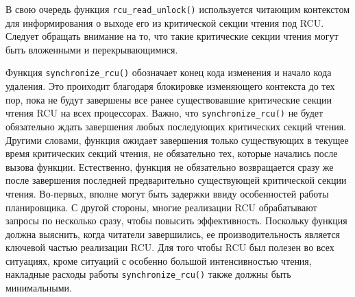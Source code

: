 В свою очередь функция \texttt{rcu\_read\_unlock()} используется читающим
контекстом для информирования о выходе его из критической секции чтения под RCU.
Следует обращать внимание на то, что такие критические секции чтения могут быть
вложенными и перекрывающимися.

Функция \texttt{synchronize\_rcu()} обозначает конец кода изменения и начало
кода удаления. Это проиходит благодаря блокировке изменяющего контекста до тех
пор, пока не будут завершены все ранее существовавшие критические секции чтения
RCU на всех процессорах. Важно, что \texttt{synchronize\_rcu()} не будет
обязательно ждать завершения любых последующих критических секций чтения.
Другими словами, функция ожидает завершения только существующих в текущее время
критических секций чтения, не обязательно тех, которые начались после вызова
функции. Естественно, функция не обязательно возвращается сразу же после
завершения последней предварительно существующей критической секции чтения.
Во-первых, вполне могут быть задержки ввиду особенностей работы планировщика. С
другой стороны, многие реализации RCU обрабатывают запросы по несколько сразу,
чтобы повысить эффективность. Поскольку функция должна выяснить, когда читатели
завершились, ее производительность является ключевой частью реализации RCU. Для
того чтобы RCU был полезен во всех ситуациях, кроме ситуаций с особенно большой
интенсивностью чтения, накладные расходы работы \texttt{synchronize\_rcu()}
также должны быть минимальными.
